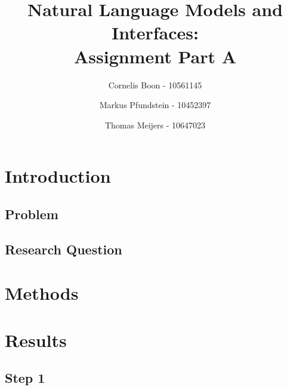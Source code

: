 \documentclass[final,12pt]{elsarticle}
\begin{document}
\begin{frontmatter}
\title{Natural Language Models and Interfaces: \\ Assignment Part A}
\author{Cornelis Boon - 10561145} 
\author{Markus Pfundstein - 10452397}
\author{Thomas Meijers - 10647023}

\begin{abstract}
\end{abstract}
\end{frontmatter}
\newpage

\section{Introduction}
\subsection{Problem}

\subsection{Research Question}
\section{Methods}
\section{Results}
\subsection{Step 1}
\end{document}
